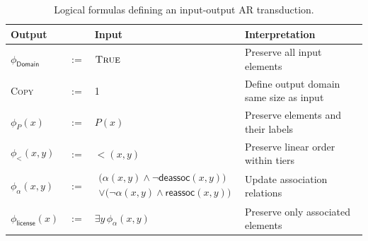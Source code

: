 \documentclass[pmlr]{jmlr}%
\begin{document}
	\begin{table}[t]
		\centering	\small 
		\begin{tabular}{llll}
			\toprule
			\textbf{Output} & & \textbf{Input} & \textbf{Interpretation} \\
			\midrule
			
			$\phi_{\textsf{Domain}}$
			&
			$:=$
			&
			$\textsc{True}$
			&
			Preserve all input elements
			\\[0.5em]
			
			
			\textsc{Copy}
			&
			$:=$
			&
			1&
			Define output domain same size as input
			\\[0.5em]
			
			$\phi_{P}(x)$
			&
			$:=$
			&
			$P(x)$
			&
			Preserve elements and their labels
			\\[0.5em]
			
			$\phi_{<}(x,y)$
			&
			$:=$
			&
			$<(x,y)$
			&
			Preserve linear order within tiers
			\\[0.5em]
			
			$\phi_{\alpha}(x,y)$
			&
			$:=$
			&
			$\begin{aligned}
				\bigl(\alpha(x,y) \land \neg \textsf{deassoc}(x,y)\bigr)\\ 
				\lor \bigl(\neg \alpha(x,y) \land \textsf{reassoc}(x,y)\bigr)
			\end{aligned}$
			&
			Update association relations
			\\[0.5em]
			$\phi_{\textsf{license}}(x)$
			&
			$:=$
			&
			$\exists y\, \phi_\alpha(x,y)$
			&
			Preserve only associated elements
			\\
			
			\bottomrule
		\end{tabular}
		
		\caption{Logical formulas defining an input-output AR transduction.}
		\label{tab.transduction}
	\end{table}
	
\end{document}
